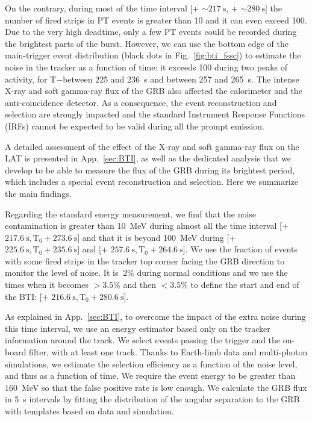 \documentclass[preprint]{aastex631}
\begin{document}
On the contrary, during most of the time interval [\trig + $\sim 217~\mathrm{s}$, \trig + $\sim 280~\mathrm{s}]$ the number of fired strips in PT events is greater than 10 and it can even exceed 100. Due to the very high deadtime, only a few PT events could be recorded during the brightest parts of the burst. However, we can use the bottom edge of the main-trigger event distribution (black dots in Fig.~\ref{fig:bti_fssc}) to estimate the noise in the tracker as a function of time: it exceeds 100 during two peaks of activity, for T$-$\trig between 225 and 236~s and between 257 and 265~s. The intense X-ray and soft gamma-ray flux of the GRB also affected the calorimeter and the anti-coincidence detector. As a consequence, the event reconstruction and selection are strongly impacted and the standard Instrument Response Functions (IRFs) cannot be expected to be valid during all the prompt emission.

A detailed assessment of the effect of the X-ray and soft gamma-ray flux on the LAT is presented in App.~\ref{sec:BTI}, as well as the dedicated analysis that we develop to be able to measure the flux of the GRB during its brightest period, which includes a special event reconstruction and selection. Here we summarize the main findings. 

Regarding the standard energy measurement, we find that the noise contamination is greater than 10~MeV during almost all the time interval [\trig + $ 217.6~\mathrm{s},\mathrm{T}_0+273.6~\mathrm{s}]$ and that it is beyond 100~MeV during [\trig + $ 225.6~\mathrm{s},\mathrm{T}_0+235.6~\mathrm{s}]$ and [\trig + $ 257.6~\mathrm{s},\mathrm{T}_0+264.6~\mathrm{s}]$. We use the fraction of events with some fired strips in the tracker top corner facing the GRB direction to monitor the level of noise. It is $~2$\% during normal conditions and we use the times when it becomes $>3.5$\% and then $<3.5$\% to define the start and end of the BTI: [\trig + $ 216.6~\mathrm{s},\mathrm{T}_0+280.6~\mathrm{s}]$.
    
As explained in App.~\ref{sec:BTI}, to overcome the impact of the extra noise during this time interval, we use an energy estimator based only on the tracker information around the track. We select events passing the trigger and the on-board filter, with at least one track. Thanks to Earth-limb data and multi-photon simulations, we estimate the selection efficiency as a function of the noise level, and thus as a function of time. We require the event energy to be greater than 160~MeV so that the false positive rate is low enough. We calculate the GRB flux in 5~s intervals by fitting the distribution of the angular separation to the GRB with templates based on data and simulation.
\end{document}
